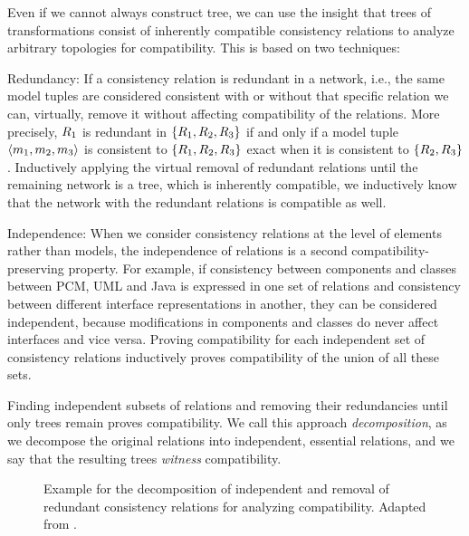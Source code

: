 Even if we cannot always construct tree, we can use the insight that trees of transformations consist of inherently compatible consistency relations to analyze arbitrary topologies for compatibility.
This is based on two techniques:
\begin{properdescription}
    \item[Redundancy:] If a consistency relation is redundant in a network, i.e., the same model tuples are considered consistent with or without that specific relation we can, virtually, remove it without affecting compatibility of the relations. More precisely, $R_{1}$ is redundant in $\{ R_{1}, R_{2}, R_{3} \}$ if and only if a model tuple $\langle m_{1}, m_{2}, m_{3} \rangle$ is consistent to $\{ R_{1}, R_{2}, R_{3} \}$ exact when it is consistent to $\{ R_{2}, R_{3} \}$.
    Inductively applying the virtual removal of redundant relations until the remaining network is a tree, which is inherently compatible, we inductively know that the network with the redundant relations is compatible as well.
    \item[Independence:] When we consider consistency relations at the level of elements rather than models, the independence of relations is a second compatibility-preserving property.
    For example, if consistency between components and classes between \gls{PCM}, UML and Java is expressed in one set of relations and consistency between different interface representations in another, they can be considered independent, because modifications in components and classes do never affect interfaces and vice versa.
    Proving compatibility for each independent set of consistency relations inductively proves compatibility of the union of all these sets.
\end{properdescription}
Finding independent subsets of relations and removing their redundancies until only trees remain proves compatibility.
We call this approach \emph{decomposition}, as we decompose the original relations into independent, essential relations, and we say that the resulting trees \emph{witness} compatibility.

\begin{figure}
    \centering
    
    \caption[Exemplary overview of compatibility analysis idea]{Example for the decomposition of independent and removal of redundant consistency relations for analyzing compatibility. Adapted from .}
    \label{fig:compatibility:decomposition}
\end{figure}

